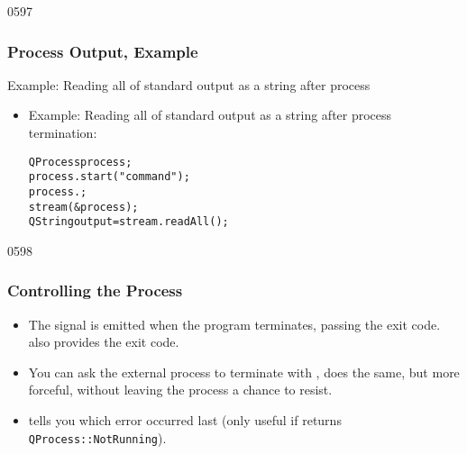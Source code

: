 \begin{slide}[fragile]{0597}
\frametitle{Process Output, Example}
Example: Reading all of standard output as a string after process
  \begin{itemize}
  \item Example: Reading all of standard output as a string after process
termination:
\begin{alltt}
QProcess process;
process.start( "command"  );
process.;
 stream( \&process );
QString output = stream.readAll();
\end{alltt}
\end{itemize}
\end{slide}

\begin{slide}[fragile]{0598}
\frametitle{Controlling the Process}
\begin{itemize}
\item The signal  is emitted when the program
terminates, passing the exit code.  also provides
the exit code.
\item You can ask the external process to terminate with
,  does the same, but more
forceful, without leaving the process a chance to resist.
\item {} tells you which error occurred last (only useful
if  returns \texttt{QProcess::NotRunning}).
\end{itemize}
\end{slide}

